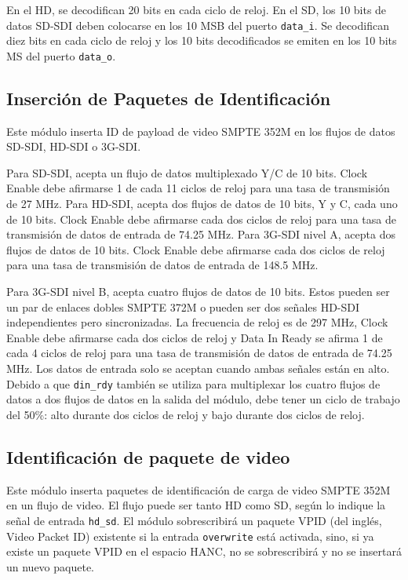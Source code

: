 En el HD, se decodifican 20 bits en cada ciclo de reloj. En el SD, los 10 bits
de datos SD-SDI deben colocarse en los 10 MSB del puerto \texttt{data\_i}. Se
decodifican diez bits en cada ciclo de reloj y los 10 bits decodificados se
emiten en los 10 bits MS del puerto \texttt{data\_o}.

\subsection{Inserción de Paquetes de Identificación}

Este módulo inserta ID de payload de video SMPTE 352M en los flujos de datos
SD-SDI, HD-SDI o 3G-SDI\@.

Para SD-SDI, acepta un flujo de datos multiplexado Y/C de 10 bits. Clock Enable
debe afirmarse 1 de cada 11 ciclos de reloj para una tasa de transmisión de 27
MHz. Para HD-SDI, acepta dos flujos de datos de 10 bits, Y y C, cada uno de
10 bits. Clock Enable debe afirmarse cada dos ciclos de reloj para una tasa de
transmisión de datos de entrada de 74.25 MHz. Para 3G-SDI nivel A, acepta dos
flujos de datos de 10 bits. Clock Enable debe afirmarse cada dos ciclos de
reloj para una tasa de transmisión de datos de entrada de 148.5 MHz.

Para 3G-SDI nivel B, acepta cuatro flujos de datos de 10 bits. Estos pueden ser
un par de enlaces dobles SMPTE 372M o pueden ser dos señales HD-SDI
independientes pero sincronizadas. La frecuencia de reloj es de 297 MHz,
Clock Enable debe afirmarse cada dos ciclos de reloj y Data In Ready se
afirma 1 de cada 4 ciclos de reloj para una tasa de transmisión de datos de
entrada de 74.25 MHz. Los datos de entrada solo se aceptan cuando ambas
señales están en alto. Debido a que \texttt{din\_rdy} también se utiliza para
multiplexar los cuatro flujos de datos a dos flujos de datos en la salida del
módulo, debe tener un ciclo de trabajo del 50\%: alto durante dos ciclos de
reloj y bajo durante dos ciclos de reloj.

\subsection{Identificación de paquete de video}

Este módulo inserta paquetes de identificación de carga de video SMPTE 352M \citep{st352} en
un flujo de video. El flujo puede ser tanto HD como SD, según lo indique la
señal de entrada \texttt{hd\_sd}. El módulo sobrescribirá un paquete VPID  (del inglés, Video Packet ID) existente si la
entrada \texttt{overwrite} está activada, sino, si ya existe un paquete VPID en
el espacio HANC, no se sobrescribirá y no se insertará un nuevo paquete.

